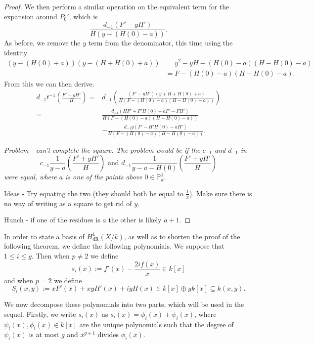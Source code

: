 \documentclass[draft, 11pt]{article} %
\theoremstyle{plain}
\theoremstyle{remark}
\newcommand{\derhamhone}{H_{\text {dR}}^1(X/k)}
\begin{document}
\begin{proof}
We then perform a similar operation on the equivalent term for the expansion around $P_0'$, which is
\[
\frac{d_{-1}(F' - yH')}{H(y - (H(0) - a))}.
\]
As before, we remove the $y$ term from the denominator, this time using the identity
\begin{align*}
(y-(H(0)+a))(y - (H+H(0)+a)) &  = y^2 - yH - (H(0) - a)(H - H(0) - a) \\
& = F - (H(0)-a)(H - H(0) - a).
\end{align*}
From this we can then derive. 
\begin{align*}
d_{-1}t^{-1} \left( \frac{F' - yH'}{H} \right)  = & d_{-1}\left( \frac{(F'  - yH')(y+ H + H(0) + a)}{H(F -(H(0)-a)(H - H(0) -a ))} \right) \\
 =&  \frac{d_{-1}(HF' + F'H(0) + aF' - FH')}{H(F-(H(0) - a)(H - H(0) - a))}  \\
& - \frac{d_{-1}y(F' - H'H(0) - aH')}{H(F - (H(0) - a)( H - H(0) - a))}.
\end{align*}



{\sl Problem - can't complete the square. The problem would be if the $c_{-1}$ and $d_{-1}$ in 
\[
c_{-1}\frac{1}{y-a}\left(\frac{F'+yH'}{H}\right) \text{ and } d_{-1}\frac{1}{y-a-H(0)}\left(\frac{F'+yH'}{H}\right)
\]
were equal, where $a$ is one of the points above $0\in \mathbb P_k^1$.

Ideas - Try equating the two (they should both be equal to $\frac{1}{x}$).
Make sure there is no way of writing as a square to get rid of $y$.

Hunch - if one of the residues is $a$ the other is likely $a+1$.}
\end{proof}



In order to state a basis of $\derhamhone$, as well as to shorten the proof of the following theorem, we define the following polynomials. 
We suppose that $1 \leq i \leq g$.
Then when $p\neq 2$ we define
\[
s_i(x) := f'(x) - \frac{2if(x)}{x} \in k[x]
\]
and when $p = 2$ we define
\begin{equation}\label{capitals}
S_i(x,y) := xF'(x) + xyH'(x) + iyH(x)\in k[x]\oplus yk[x] \subseteq k(x,y).
\end{equation}

We now decompose these polynomials into two parts, which will be used in the sequel.
Firstly, we write $s_i(x)$ as $s_i(x) = \phi_i(x) + \psi_i(x)$, where $\psi_i(x), \phi_i(x) \in k[x]$ are the unique polynomials such that the degree of $\psi_i (x)$ is at most $g$ and $x^{g+1}$ divides $\phi_i(x)$.
\end{document}
